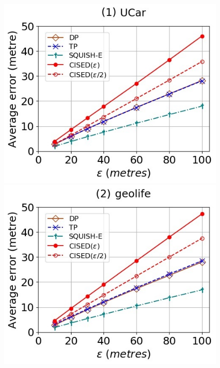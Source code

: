 \begin{figure}[tb!]
	\centering
	\includegraphics[scale = 0.400]{Figures/Exp-when-SED-error-epsilon-service.jpg}\hspace{2ex}
	\includegraphics[scale = 0.400]{Figures/Exp-when-SED-error-epsilon-geolife.jpg}\hspace{2ex}

\end{figure}
